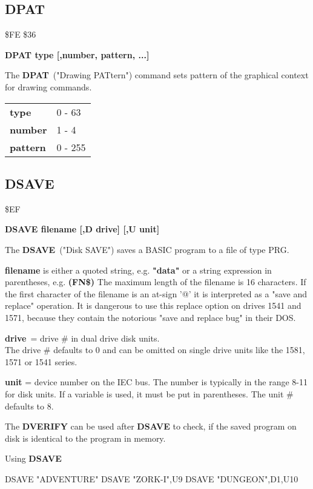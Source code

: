 
\newpage
\subsection{DPAT}
\begin{description}[leftmargin=3cm,style=nextline]
\item [Token:] \$FE \$36
\item [Format:] {\bf DPAT type [,number, pattern, ...]}
\item [Usage:]
   The {\bf DPAT} ("Drawing PATtern") command sets pattern
   of the graphical context for drawing commands.

\ttfamily
\begin{tabular}{|l|l|}
\hline
   {\bf type}       &  0 - 63 \\
   {\bf number}     &  1 - 4 \\
   {\bf pattern}    &  0 - 255 \\
\hline
\end{tabular}
\end{description}


\newpage
\subsection{DSAVE}
\begin{description}[leftmargin=3cm,style=nextline]
\item [Token:] \$EF
\item [Format:] {\bf DSAVE filename [,D drive] [,U unit] }
\item [Usage:]
   The {\bf DSAVE} ("Disk SAVE") saves a BASIC program to
   a file of type PRG.

   {\bf filename} is either a quoted string, e.g. {\bf "data"} or
   a string expression in parentheses, e.g. {\bf (FN\$)}
   The maximum length of the filename is 16 characters.
   If the first character of the filename is an at-sign '@' it
   is interpreted as a "save and replace" operation. It is dangerous
   to use this replace option on drives 1541 and 1571, because they
   contain the notorious "save and replace bug" in their DOS.

   {\bf drive} = drive \# in dual drive disk units. \\
   The drive \# defaults to 0 and can be omitted on single drive units
   like the 1581, 1571 or 1541 series.

   {\bf unit} = device number on the IEC bus.
   The number is typically in the range 8-11 for disk units.
   If a variable is used, it must be put in parentheses.
   The unit \# defaults to 8.

\item [Remarks:]
   The {\bf DVERIFY} can be used after {\bf DSAVE} to check,
   if the saved program on disk is identical to the program
   in memory.

\item [Example:] Using {\bf DSAVE}
\begin{screenoutput}
  DSAVE "ADVENTURE"
  DSAVE "ZORK-I",U9
  DSAVE "DUNGEON",D1,U10
\end{screenoutput}
\end{description}

